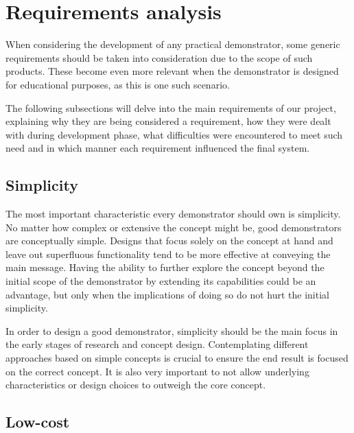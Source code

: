 \section{Requirements analysis} \label{sec:requirements}


When considering the development of any practical demonstrator, some generic requirements should be taken into consideration due to the scope of such products.
These become even more relevant when the demonstrator is designed for educational purposes, as this is one such scenario.

The following subsections will delve into the main requirements of our project, explaining why they are being considered a requirement, how they were dealt with during development phase, what difficulties were encountered to meet such need and in which manner each requirement influenced the final system.

\subsection{Simplicity}

The most important characteristic every demonstrator should own is simplicity.
No matter how complex or extensive the concept might be, good demonstrators are conceptually simple.
Designs that focus solely on the concept at hand and leave out superfluous functionality tend to be more effective at conveying the main message.
Having the ability to further explore the concept beyond the initial scope of the demonstrator by extending its capabilities could be an advantage, but only when the implications of doing so do not hurt the initial simplicity.

In order to design a good demonstrator, simplicity should be the main focus in the early stages of research and concept design.
Contemplating different approaches based on simple concepts is crucial to ensure the end result is focused on the correct concept.
It is also very important to not allow underlying characteristics or design choices to outweigh the core concept.

\subsection{Low-cost} \label{sec:low-cost}

